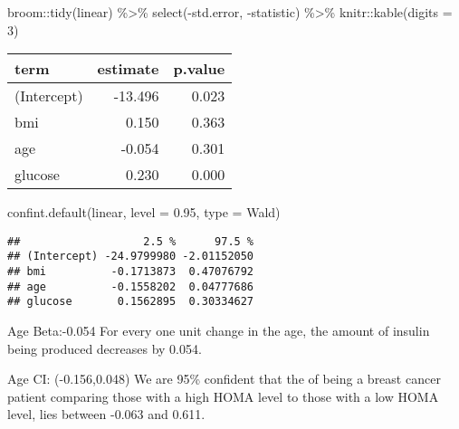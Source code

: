 \documentclass[
]{article}
\newenvironment{Shaded}{\begin{snugshade}}{\end{snugshade}}
\newcommand{\AttributeTok}[1]{\textcolor[rgb]{0.77,0.63,0.00}{#1}}
\newcommand{\DecValTok}[1]{\textcolor[rgb]{0.00,0.00,0.81}{#1}}
\newcommand{\FloatTok}[1]{\textcolor[rgb]{0.00,0.00,0.81}{#1}}
\newcommand{\FunctionTok}[1]{\textcolor[rgb]{0.00,0.00,0.00}{#1}}
\newcommand{\NormalTok}[1]{#1}
\newcommand{\SpecialCharTok}[1]{\textcolor[rgb]{0.00,0.00,0.00}{#1}}
\begin{document}
\begin{Shaded}
\begin{Highlighting}[]
\NormalTok{broom}\SpecialCharTok{::}\FunctionTok{tidy}\NormalTok{(linear) }\SpecialCharTok{\%\textgreater{}\%}
  \FunctionTok{select}\NormalTok{(}\SpecialCharTok{{-}}\NormalTok{std.error, }\SpecialCharTok{{-}}\NormalTok{statistic) }\SpecialCharTok{\%\textgreater{}\%}
\NormalTok{  knitr}\SpecialCharTok{::}\FunctionTok{kable}\NormalTok{(}\AttributeTok{digits =} \DecValTok{3}\NormalTok{)}
\end{Highlighting}
\end{Shaded}

\begin{longtable}[]{@{}lrr@{}}
\toprule
term & estimate & p.value \\
\midrule
\endhead
(Intercept) & -13.496 & 0.023 \\
bmi & 0.150 & 0.363 \\
age & -0.054 & 0.301 \\
glucose & 0.230 & 0.000 \\
\bottomrule
\end{longtable}

\begin{Shaded}
\begin{Highlighting}[]
\FunctionTok{confint.default}\NormalTok{(linear, }\AttributeTok{level =} \FloatTok{0.95}\NormalTok{, }\AttributeTok{type =}\NormalTok{ Wald)}
\end{Highlighting}
\end{Shaded}

\begin{verbatim}
##                   2.5 %      97.5 %
## (Intercept) -24.9799980 -2.01152050
## bmi          -0.1713873  0.47076792
## age          -0.1558202  0.04777686
## glucose       0.1562895  0.30334627
\end{verbatim}

Age Beta:-0.054 For every one unit change in the age, the amount of
insulin being produced decreases by 0.054.

Age CI: (-0.156,0.048) We are 95\% confident that the of being a breast
cancer patient comparing those with a high HOMA level to those with a
low HOMA level, lies between -0.063 and 0.611.
\end{document}
